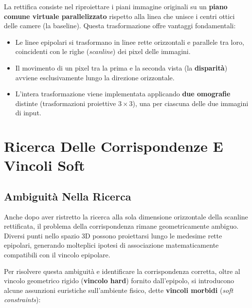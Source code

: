 ﻿\documentclass[11pt, a4paper]{article}
\begin{document}
La rettifica consiste nel riproiettare i piani immagine originali su un \textbf{piano comune virtuale parallelizzato} rispetto alla linea che unisce i centri ottici delle camere (la baseline). Questa trasformazione offre vantaggi fondamentali:
\begin{itemize}
    \item Le linee epipolari si trasformano in linee rette orizzontali e parallele tra loro, coincidenti con le righe (\emph{scanline}) dei pixel delle immagini.
    \item Il movimento di un pixel tra la prima e la seconda vista (la \textbf{disparità}) avviene esclusivamente lungo la direzione orizzontale.
    \item L'intera trasformazione viene implementata applicando \textbf{due omografie} distinte (trasformazioni proiettive $3 \times 3$), una per ciascuna delle due immagini di input.
\end{itemize}


\newpage

\section{Ricerca Delle Corrispondenze E Vincoli Soft}

\subsection{Ambiguità Nella Ricerca}

Anche dopo aver ristretto la ricerca alla sola dimensione orizzontale della scanline rettificata, il problema della corrispondenza rimane geometricamente ambiguo. Diversi punti nello spazio 3D possono proiettarsi lungo le medesime rette epipolari, generando molteplici ipotesi di associazione matematicamente compatibili con il vincolo epipolare.


Per risolvere questa ambiguità e identificare la corrispondenza corretta, oltre al vincolo geometrico rigido (\textbf{vincolo hard}) fornito dall'epipolo, si introducono alcune assunzioni euristiche sull'ambiente fisico, dette \textbf{vincoli morbidi} (\emph{soft constraints}):
\end{document}
